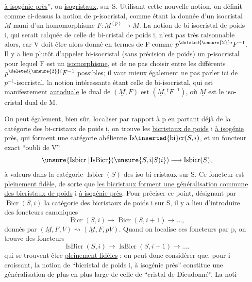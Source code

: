 
\uline{à isogénie près}'', ou \uline{isogristaux}, sur S. Utilisant cette nouvelle notion, on définit comme ci-dessus la notion de p-isocristal, comme étant la donnée d'un isocristal $\underline M$ muni d'un homomorphisme $F:\underline M^{(p)}\longrightarrow\underline M$. La notion de bi-isocristal de poids i, qui serait calquée de celle de bi-cristal de poids i, n'est pas très raisonnable alors, car V doit être alors donné en termes de F comme $p^{\deleted{\unsure{2}}i}F^{-1}$. Il y a lieu plutôt d'appeler \uline{bi-isocristal} (sans précision de poids) un p-isocristal pour lequel F est un \uline{isomorphisme}, et de ne pas choisir entre les différents $p^{\deleted{\unsure{2}}i}F^{-1}$ possibles; il vaut mieux également ne pas parler ici de $p^{-1}$-isocristal, la notion intéressante étant celle de bi-isocristal, qui est manifestement \uline{autoduale}   le dual de $(\underline M,F)$ est $(\underline M,{}^tF^{-1})$, où $\underline M$ est le iso-cristal dual de M.

On peut également, bien sûr, localiser par rapport à p en partant déjà de la catégorie des bi-cristaux de poids i, on trouve les \uline{bicristaux de poids} i \uline{à isogénie près}, qui forment une catégorie abélienne $\mathrm{Is}\inserted{\mathrm{bi}}\mathrm{cr}(S,i)$, et un foncteur exact ``oubli de V''
\[
\unsure{\operatorname{Isbicr}|\operatorname{IsBicr}}(\unsure{S,i|S)i})\longrightarrow\operatorname{Isbicr}(S),
\]
à valeurs dans la catégorie $\operatorname{Isbicr}(S)$ des iso-bi-cristaux sur S. Ce foncteur est  \uline{pleinement fidèle}, de sorte que \uline{les bicristaux forment une généralisation commune des bicristaux de poids} i \uline{à isogénie près}. Pour préciser ce point, désignant par $\operatorname{Bicr}(S,i)$ la catégorie des bicristaux de poids i sur S, il y a lieu d'introduire des foncteurs canoniques
\[
\operatorname{Bicr}(S,i)\longrightarrow\operatorname{Bicr}(S,i+1)\longrightarrow\ldots,
\]
donnés par $(\underline M,F,V)\rightsquigarrow(\underline M,F,pV)$. Quand on localise ces foncteurs par p, on trouve des foncteurs
\[
\operatorname{IsBicr}(S,i)\longrightarrow\operatorname{IsBicr}(S,i+1)\longrightarrow\ldots.
\]
qui se trouvent être \uline{pleinement fidèles} : on peut donc considérer que, pour i croissant, la notion de ``bicristal de poids i, à isogénie près'' constitue une généralisation de plus en plus large de celle de ``cristal de Dieudonné''. La noti-
